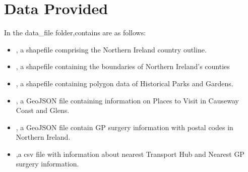 \documentclass[letterpaper,10pt,english]{sphinxmanual}
\begin{document}
\section{Data Provided}
\label{\detokenize{egm722_serenee/NI_Tourist_Map_doc:data-provided}}
\sphinxAtStartPar
In the data\_file folder,contains are as follows:
\begin{itemize}
\item {} 
\sphinxAtStartPar
{}, a shapefile comprising the Northern Ireland country outline.

\item {} 
\sphinxAtStartPar
{}, a shapefile containing the boundaries of Northern Ireland’s counties

\item {} 
\sphinxAtStartPar
{} , a shapefile containing polygon data of Historical Parks and Gardens.

\item {} 
\sphinxAtStartPar
{}, a GeoJSON file containing information on Places to Visit in Causeway Coast and Glens.

\item {} 
\sphinxAtStartPar
{}, a GeoJSON file contain GP surgery information with postal codes in Northern Ireland.

\item {} 
\sphinxAtStartPar
{},a csv file with information about nearest Transport Hub and Nearest GP surgery information.

\end{itemize}
\end{document}
